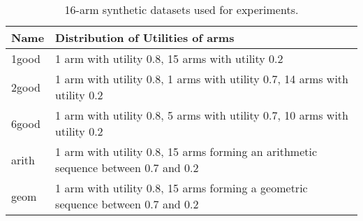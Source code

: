 \newpage
\begin{table*}[t]
\centering
\begin{tabular}{|l|l|}
\hline
Name  & Distribution of Utilities of arms \\ \hline
\hline
1good & 1 arm with utility 0.8, 15 arms with utility 0.2  \\ \hline
2good & 1 arm with utility 0.8, 1 arms with utility 0.7, 14 arms with utility 0.2  \\ \hline
6good & 1 arm with utility 0.8, 5 arms with utility 0.7, 10 arms with utility 0.2   \\ \hline
arith & 1 arm with utility 0.8, 15 arms forming an arithmetic sequence between 0.7 and 0.2 \\ \hline
geom  & 1 arm with utility 0.8, 15 arms forming a geometric sequence between 0.7 and 0.2 \\ \hline
\end{tabular}
\caption{16-arm synthetic datasets used for experiments.}
\label{tab:arms2}
\vspace{-0.1in}
\end{table*}